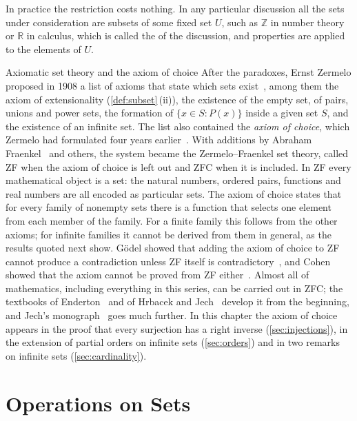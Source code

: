 In practice the restriction costs nothing. In any particular discussion all the sets under consideration are subsets of some fixed set $U$, such as $\mathbb Z$ in number theory or $\mathbb R$ in calculus, which is called the  of the discussion, and properties are applied to the elements of $U$.

\begin{note}{Axiomatic set theory and the axiom of choice}
After the paradoxes, Ernst Zermelo proposed in 1908 a list of axioms that state which sets exist~\cite{zermelo1908}, among them the axiom of extensionality (\cref{def:subset}\,(ii)), the existence of the empty set, of pairs, unions and power sets, the formation of $\{x\in S: P(x)\}$ inside a given set $S$, and the existence of an infinite set. The list also contained the \emph{axiom of choice}, which Zermelo had formulated four years earlier~\cite{zermelo1904}. With additions by Abraham Fraenkel~\cite{fraenkel1922} and others, the system became the Zermelo--Fraenkel set theory, called ZF when the axiom of choice is left out and ZFC when it is included. In ZF every mathematical object is a set: the natural numbers, ordered pairs, functions and real numbers are all encoded as particular sets. The axiom of choice states that for every family of nonempty sets there is a function that selects one element from each member of the family. For a finite family this follows from the other axioms; for infinite families it cannot be derived from them in general, as the results quoted next show. G\"odel showed that adding the axiom of choice to ZF cannot produce a contradiction unless ZF itself is contradictory~\cite{godel1940}, and Cohen showed that the axiom cannot be proved from ZF either~\cite{cohen1963,cohen1964}. Almost all of mathematics, including everything in this series, can be carried out in ZFC; the textbooks of Enderton~\cite{enderton1977sets} and of Hrbacek and Jech~\cite{hrbacek1999} develop it from the beginning, and Jech's monograph~\cite{jech2003} goes much further. In this chapter the axiom of choice appears in the proof that every surjection has a right inverse (\cref{sec:injections}), in the extension of partial orders on infinite sets (\cref{sec:orders}) and in two remarks on infinite sets (\cref{sec:cardinality}).
\end{note}

\section{Operations on Sets}
\label{sec:set-operations}

